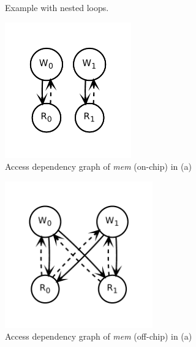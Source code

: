 \begin{figure}
\centering
\begin{subfigure}[b]{0.34\textwidth}
\inputminted{python}{code/dep1.py}
\caption {
  Example with nested loops.
}
\end{subfigure}
\hfill
\begin{subfigure}[b]{0.3\textwidth}
  \centering
\includegraphics[width=0.6\textwidth]{figs/dep1.pdf}
\caption{
  Access dependency graph of \emph{mem} (on-chip) in (a)
}
\end{subfigure}
\hfill
\begin{subfigure}[b]{0.3\textwidth}
  \centering
\includegraphics[width=0.7\textwidth]{figs/dep2.pdf}
\caption{
  Access dependency graph of \emph{mem} (off-chip) in (a)
}
\end{subfigure}
\\
\begin{subfigure}[b]{0.4\textwidth}

\end{subfigure}
\end{figure}
